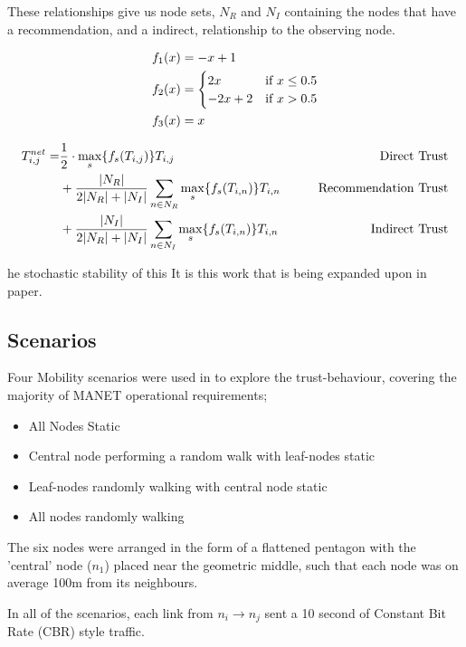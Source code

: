 \documentclass[runningheads,a4paper]{llncs}
\begin{document}
These relationships give us node sets, $N_R$ and $N_I$ containing the nodes that have a recommendation, and a indirect, relationship to the observing node.

\begin{align}
  \label{eq:whitenization}
  f_1(x) &= -x+1\notag\\
  f_2(x) &= 
  \begin{cases}
    2x & \text{if }x\leq 0.5\\
    -2x+2 & \text{if }x>0.5
  \end{cases}\\
  f_3(x) &= x\notag
\end{align}

\begin{align}
  \label{eq:networkeffects}
  T_{i,j}^{net}=&\frac{1}{2} \cdot \max_s\{f_s(T_{i,j})\} T_{i,j}&\qquad \text{Direct Trust}\notag \\
  &+ \frac{|N_R| }{2|N_R| + |N_I|}\sum_{n \in N_R} \max_s\{f_s(T_{i,n})\} T_{i,n}&\qquad \text{Recommendation Trust}\notag\\
  &+ \frac{|N_I| }{2|N_R| + |N_I|}\sum_{n \in N_I} \max_s\{f_s(T_{i,n})\} T_{i,n} &\qquad \text{Indirect Trust}
\end{align}

\cite{Guo11}he stochastic stability of this 
It is this work that is being expanded upon in paper.

\subsection{Scenarios}

Four Mobility scenarios were used in \cite{Guo11} to explore the trust-behaviour, covering the majority of MANET operational requirements; 

\begin{itemize}
  \item All Nodes Static
  \item Central node performing a random walk with leaf-nodes static
  \item Leaf-nodes randomly walking with central node static
  \item All nodes randomly walking
\end{itemize}

The six nodes were arranged in the form of a flattened pentagon with the 'central' node ($n_1$) placed near the geometric middle, such that each node was on average 100m from its neighbours.

In all of the scenarios, each link from $n_i \rightarrow n_j$ sent a 10 second of Constant Bit Rate (CBR) style traffic.
\end{document}
